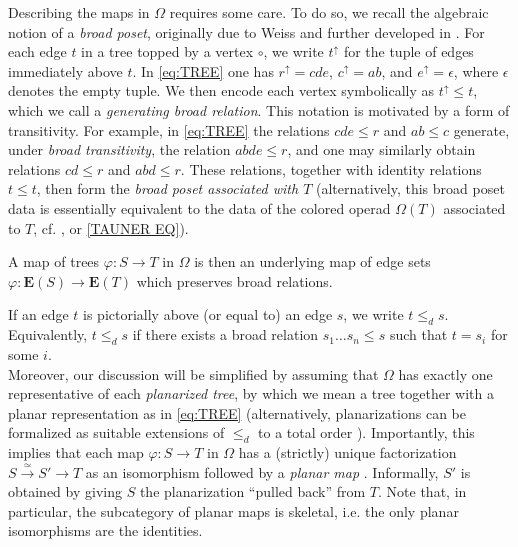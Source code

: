 \documentclass[a4paper,10pt
,draft
]{article}%
\numberwithin{equation}{section}
\numberwithin{figure}{section}
\theoremstyle{definition} %
\newcommand{\1}{\ensuremath{\mathbbm 1}}%
\begin{document}
Describing the maps in $\Omega$ requires some care.
To do so, we recall the algebraic notion of
a \emph{broad poset},
originally due to Weiss \cite{Wei12}
and further developed in \cite{Per18}.
%
For each edge $t$ in a tree topped by a vertex $\circ$, we write
$t^{\uparrow}$
for the tuple of edges immediately above $t$.
In \eqref{eq:TREE} one has  
$r^{\uparrow} = cde$, 
$c^\uparrow = ab$, 
and $e^\uparrow = \epsilon$,
where $\epsilon$ denotes the empty tuple.
We then encode each vertex symbolically as
$t^{\uparrow} \leq t$,
which we call a 
\emph{generating broad relation}.
This notation is motivated by a form of transitivity.
For example,
in \eqref{eq:TREE}
the relations
$cde \leq r$ and $ab \leq c$
generate, under \emph{broad transitivity},
the relation $abde \leq r$,
and one may similarly obtain relations
$cd \leq r$ and $abd \leq r$.
These relations, together with identity relations $t \leq t$,
then form the \emph{broad poset associated with $T$}
(alternatively, this broad poset data
is essentially equivalent to the data of
the colored operad $\Omega(T)$ associated to $T$, 
cf. \cite[\S 3]{MW07},
\cite[Rem. 4.4]{Per18}
or \eqref{TAUNER EQ}).


A map of trees $\varphi \colon S \to T$
in $\Omega$ is then an underlying map
of edge sets 
$\varphi \colon \boldsymbol{E}(S) \to \boldsymbol{E}(T)$
which preserves broad relations.



If an edge $t$ is pictorially above (or equal to) an edge $s$, we write $t \leq_d s$.
Equivalently, $t \leq_d s$ if there exists a broad relation $s_1\dots s_n \leq s$ such that $t = s_i$ for some $i$.
\\

Moreover,
our discussion will be simplified by assuming 
that $\Omega$ has exactly one representative of 
each \emph{planarized tree},
by which we mean a tree together with a planar representation as in \eqref{eq:TREE}
(alternatively, 
planarizations can be formalized as
suitable extensions of $\leq_d$ to a total order
\cite[\S 3.1]{BP_geo}).
Importantly, this implies that each map  
$\varphi \colon S \to T$ in $\Omega$
has a (strictly) unique factorization
$S \xrightarrow{\simeq} S' \to T$
as an isomorphism followed by a \emph{planar map}
\cite[Prop. 3.24]{BP_geo}.
Informally, $S'$ is obtained by giving $S$ the planarization ``pulled back'' from $T$.
Note that, 
in particular, the subcategory of planar maps is skeletal,
i.e. the only planar isomorphisms are the identities.
\end{document}
